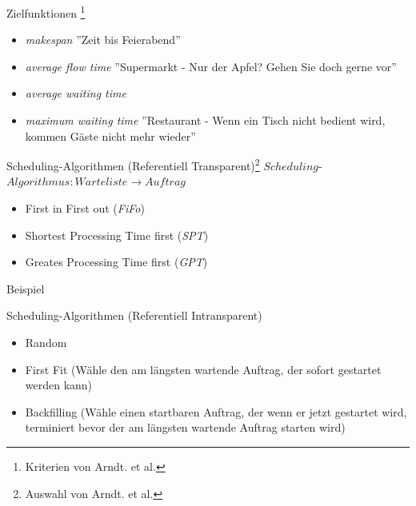 \documentclass[aspectratio=169,10pt]{beamer}
\begin{document}
\begin{frame}[t,fragile]{Zielfunktionen \footnote{Kriterien von Arndt. et al.}}
\begin{itemize}[<+->]
	\item \emph{makespan} ''Zeit bis Feierabend''
	\item \emph{average flow time} ''Supermarkt - Nur der Apfel? Gehen Sie doch gerne vor''
	\item \emph{average waiting time} 	
	\item \emph{maximum waiting time} ''Restaurant - Wenn ein Tisch nicht bedient wird, kommen G\"aste nicht mehr wieder''
\end{itemize}
\end{frame}

\begin{frame}[t, fragile]{Scheduling-Algorithmen (Referentiell Transparent)\footnote{Auswahl von Arndt. et al.}} 
$Scheduling$-$Algorithmus : Warteliste \rightarrow Auftrag$\\
\pause

\begin{itemize}[<+->]
	\item First in First out (\emph{FiFo})
	\item Shortest Processing Time first (\emph{SPT})
	\item Greates Processing Time first (\emph{GPT})
\end{itemize}
\end{frame}



\begin{frame}[t,fragile]{Beispiel}
\end{frame}



\begin{frame}[t, fragile]{Scheduling-Algorithmen (Referentiell Intransparent)}
\begin{itemize}[<+->]
	\item Random
	\item \alert{First Fit} (W\"ahle den am l\"angsten wartende Auftrag, der sofort gestartet werden kann)
	\item \alert{Backfilling} (W\"ahle einen startbaren Auftrag, der wenn er jetzt gestartet wird, terminiert bevor der am l\"angsten wartende Auftrag starten wird)
\end{itemize}
\end{frame}
\end{document}
